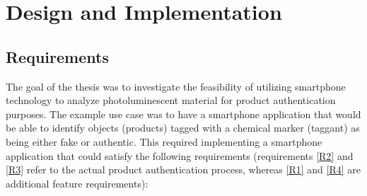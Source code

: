 \documentclass[thesis.tex]{subfiles}
\begin{document}
\chapter{Design and Implementation}
\label{chapter:design-implementation}

\section{Requirements}

The goal of the thesis was to investigate the feasibility of utilizing smartphone technology to analyze photoluminescent material for product authentication purposes. The example use case was to have a smartphone application that would be able to identify objects (products) tagged with a chemical marker (taggant) as being either fake or authentic. This required implementing a smartphone application that could satisfy the following requirements (requirements \ref{R2} and \ref{R3} refer to the actual product authentication process, whereas \ref{R1} and \ref{R4} are additional feature requirements):\\
\end{document}
